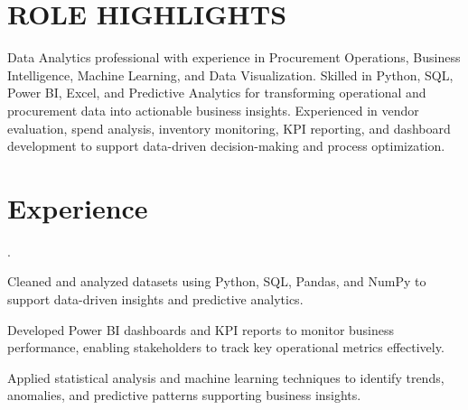 \documentclass[]{deedy-resume-reversed}
\begin{document}

\begin{minipage}[t]{0.65\textwidth}



\section{ROLE HIGHLIGHTS}

Data Analytics professional with experience in Procurement Operations, Business Intelligence, Machine Learning, and Data Visualization. Skilled in Python, SQL, Power BI, Excel, and Predictive Analytics for transforming operational and procurement data into actionable business insights. Experienced in vendor evaluation, spend analysis, inventory monitoring, KPI reporting, and dashboard development to support data-driven decision-making and process optimization.

\sectionsep


\section{Experience}

.
\begin{tightemize}
\item Cleaned and analyzed datasets using Python, SQL, Pandas, and NumPy to support data-driven insights and predictive analytics.
\item Developed Power BI dashboards and KPI reports to monitor business performance, enabling stakeholders to track key operational metrics effectively.
\item Applied statistical analysis and machine learning techniques to identify trends, anomalies, and predictive patterns supporting business insights.
\end{tightemize}

\sectionsep



\end{minipage}
\end{document}
